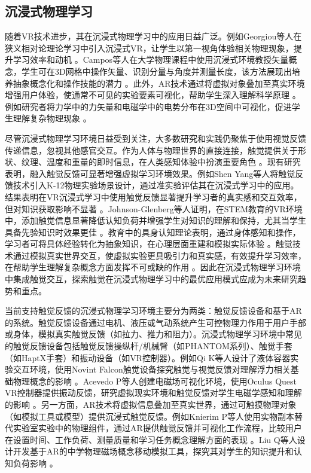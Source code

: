 \documentclass[runningheads]{llncs}
\begin{document}
\subsection{沉浸式物理学习}
随着VR技术进步，其在沉浸式物理学习中的应用日益广泛。例如Georgiou等人在狭义相对论理论学习中引入沉浸式VR，让学生以第一视角体验相关物理现象，提升学习效率和动机 \cite{georgiou2021learning}。Campos等人在大学物理课程中使用沉浸式环境教授矢量概念，学生可在3D网格中操作矢量、识别分量与角度并测量长度，该方法展现出培养抽象概念化和操作技能的潜力 \cite{campos2022impact}。此外，AR技术通过将虚拟对象叠加至真实环境增强用户体验，使通常不可见的实验要素可视化，帮助学生深入理解科学原理 \cite{pegrum2021augmented,prahani2022trend}。例如研究者将力学中的力矢量和电磁学中的电势分布在3D空间中可视化，促进学生理解复杂物理现象 \cite{al2020effectiveness,teichrew2020augmented,ismail2019enhancing,boettcher2021using}。

尽管沉浸式物理学习环境日益受到关注，大多数研究和实践仍聚焦于使用视觉反馈传递信息，忽视其他感官交互。作为人体与物理世界的直接连接，触觉提供关于形状、纹理、温度和重量的即时信息，在人类感知体验中扮演重要角色 \cite{zhang2023active}。现有研究表明，融入触觉反馈可显著增强虚拟学习环境效果。例如Shen Yang等人将触觉反馈技术引入K-12物理实验场景设计，通过准实验评估其在沉浸式学习中的应用。结果表明在VR沉浸式学习中使用触觉反馈显著提升学习者的真实感和交互效率，但对知识获取影响不显著 \cite{shen2023research}。Johnson-Glenberg等人证明，在STEM教育的VR环境中，添加触觉信息显著降低认知负荷并增强学生对知识的理解和保持，尤其当学生具备先验知识时效果更佳 \cite{johnson2023embodied}。教育中的具身认知理论表明，通过身体感知和操作，学习者可将具体经验转化为抽象知识，在心理层面重建和模拟实际体验 \cite{varela2017embodied}。触觉技术通过模拟真实世界交互，使虚拟实验更具吸引力和真实感，有效提升学习效率，在帮助学生理解复杂概念方面发挥不可或缺的作用 \cite{shapiro2019embodied}。因此在沉浸式物理学习环境中集成触觉交互，探索触觉在沉浸式物理学习中的最优应用模式应成为未来研究趋势和重点。

当前支持触觉反馈的沉浸式物理学习环境主要分为两类：触觉反馈设备和基于AR的系统。触觉反馈设备通过电机、液压或气动系统产生可控物理力作用于用户手部或身体，模拟真实触觉反馈（如拉力、推力和阻力）。沉浸式物理学习环境中常见的触觉反馈设备包括触觉反馈操纵杆/机械臂（如PHANTOM系列）、触觉手套（如HaptX手套）和振动设备（如VR控制器）。例如Qi K等人设计了液体容器实验交互环境，使用Novint Falcon触觉设备探究触觉与视觉反馈对理解浮力相关基础物理概念的影响 \cite{qi2020impact}。Acevedo P等人创建电磁场可视化环境，使用Oculus Quest VR控制器提供振动反馈，研究虚拟现实环境和触觉反馈对学生电磁学感知和理解的影响 \cite{acevedo2022effects}。另一方面，AR技术将虚拟信息叠加至真实世界，通过可触摸物理对象（如模拟工具或模型）提供沉浸式触觉反馈。例如Knierim P等人使用实物副本替代实验室实验中的物理组件，通过AR提供触觉反馈并可视化工作流程，比较用户在设置时间、工作负荷、测量质量和学习任务概念理解方面的表现 \cite{knierim2020tangibility}。Liu Q等人设计开发基于AR的中学物理磁场概念移动模拟工具，探究其对学生的知识提升和认知负荷影响 \cite{liu2021effects}。
\end{document}
